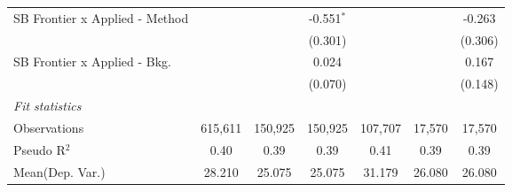 \begin{tabular}{lcccccc}
   SB Frontier x Applied - Method &               &              & -0.551$^{*}$   &               &             & -0.263\\   
                                  &               &              & (0.301)        &               &             & (0.306)\\   
   SB Frontier x Applied - Bkg.   &               &              & 0.024          &               &             & 0.167\\   
                                  &               &              & (0.070)        &               &             & (0.148)\\   
   \midrule
   \emph{Fit statistics}\\
   Observations                   & 615,611       & 150,925      & 150,925        & 107,707       & 17,570      & 17,570\\  
   Pseudo R$^2$                   & 0.40          & 0.39         & 0.39           & 0.41          & 0.39        & 0.39\\  
Mean(Dep. Var.) & 28.210 & 25.075 & 25.075 & 31.179 & 26.080 & 26.080 \\
   

\end{tabular}
